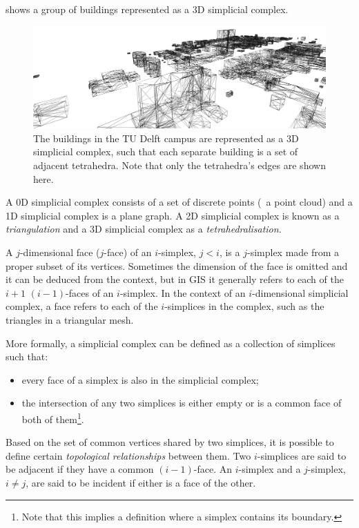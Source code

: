  shows a group of buildings represented as a 3D simplicial complex.
\begin{figure}[b]
\centering
\includegraphics[width=\linewidth]{figs/simplicescampus}
\caption[The TU Delft campus as a 3D simplicial complex]{The buildings in the TU Delft campus are represented as a 3D simplicial complex, such that each separate building is a set of adjacent tetrahedra. Note that only the tetrahedra's edges are shown here.}
\label{fig:simplicescampus}
\end{figure}
A 0D simplicial complex consists of a set of discrete points (\ie\ a point cloud) and a 1D simplicial complex is a plane graph.
A 2D simplicial complex is known as a \emph{triangulation} and a 3D simplicial complex as a \emph{tetrahedralisation}.

A $j$-dimensional face ($j$-face) of an $i$-simplex, $j < i$, is a $j$-simplex made from a proper subset of its vertices.
Sometimes the dimension of the face is omitted and it can be deduced from the context, but in GIS it generally refers to each of the $i+1$ $(i-1)$-faces of an $i$-simplex.
In the context of an $i$-dimensional simplicial complex, a face refers to each of the $i$-simplices in the complex, such as the triangles in a triangular mesh.

More formally, a simplicial complex can be defined as a collection of simplices such that:
\begin{itemize}
\item
every face of a simplex is also in the simplicial complex;
\item
the intersection of any two simplices is either empty or is a common face of both of them\footnote{Note that this implies a definition where a simplex contains its boundary.}.
\end{itemize}

Based on the set of common vertices shared by two simplices, it is possible to define certain \emph{topological relationships} between them.
Two $i$-simplices are said to be adjacent if they have a common $(i-1)$-face.
An $i$-simplex and a $j$-simplex, $i \neq j$, are said to be incident if either is a face of the other.

